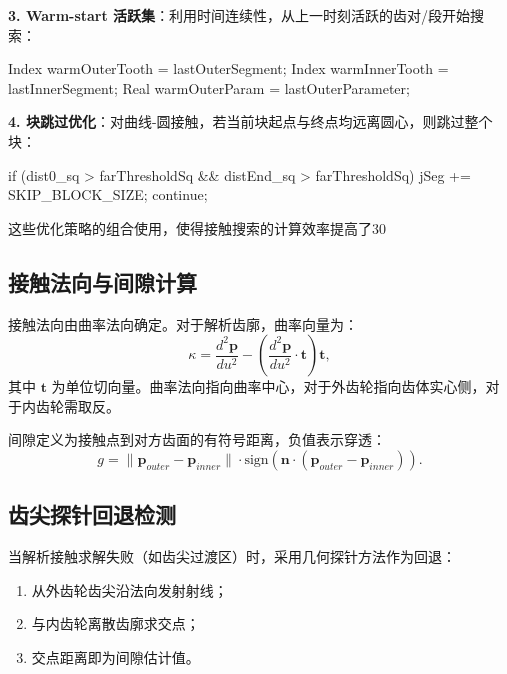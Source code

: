 \documentclass[12pt]{ctexart}
\begin{document}
\textbf{3. Warm-start 活跃集}：利用时间连续性，从上一时刻活跃的齿对/段开始搜索：

\begin{cppcode}
Index warmOuterTooth = lastOuterSegment;
Index warmInnerTooth = lastInnerSegment;
Real warmOuterParam = lastOuterParameter;
\end{cppcode}

\textbf{4. 块跳过优化}：对曲线-圆接触，若当前块起点与终点均远离圆心，则跳过整个块：

\begin{cppcode}[块跳过策略]
if (dist0_sq > farThresholdSq && distEnd_sq > farThresholdSq) {
    jSeg += SKIP_BLOCK_SIZE;
    continue;
}
\end{cppcode}

这些优化策略的组合使用，使得接触搜索的计算效率提高了30%

\subsection{接触法向与间隙计算}

接触法向由曲率法向确定。对于解析齿廓，曲率向量为：
\begin{equation}
\kappa = \frac{d^2\mathbf{p}}{du^2} - \left(\frac{d^2\mathbf{p}}{du^2} \cdot \mathbf{t}\right)\mathbf{t},
\end{equation}
其中 $\mathbf{t}$ 为单位切向量。曲率法向指向曲率中心，对于外齿轮指向齿体实心侧，对于内齿轮需取反。

间隙定义为接触点到对方齿面的有符号距离，负值表示穿透：
\begin{equation}
g = \|\mathbf{p}_{outer} - \mathbf{p}_{inner}\| \cdot \text{sign}(\mathbf{n} \cdot (\mathbf{p}_{outer} - \mathbf{p}_{inner})).
\end{equation}

\subsection{齿尖探针回退检测}

当解析接触求解失败（如齿尖过渡区）时，采用几何探针方法作为回退：
\begin{enumerate}
  \item 从外齿轮齿尖沿法向发射射线；
  \item 与内齿轮离散齿廓求交点；
  \item 交点距离即为间隙估计值。
\end{enumerate}
\end{document}
